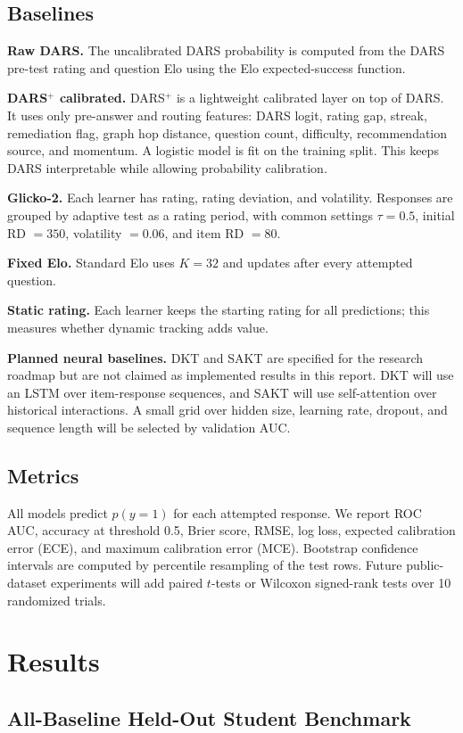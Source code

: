 \documentclass[sigconf,nonacm]{acmart}
\begin{document}
\subsection{Baselines}
\textbf{Raw DARS.} The uncalibrated DARS probability is computed from the DARS pre-test rating and question Elo using the Elo expected-success function.

\textbf{DARS$^+$ calibrated.} DARS$^+$ is a lightweight calibrated layer on top of DARS. It uses only pre-answer and routing features: DARS logit, rating gap, streak, remediation flag, graph hop distance, question count, difficulty, recommendation source, and momentum. A logistic model is fit on the training split. This keeps DARS interpretable while allowing probability calibration.

\textbf{Glicko-2.} Each learner has rating, rating deviation, and volatility. Responses are grouped by adaptive test as a rating period, with common settings $\tau=0.5$, initial RD $=350$, volatility $=0.06$, and item RD $=80$.

\textbf{Fixed Elo.} Standard Elo uses $K=32$ and updates after every attempted question.

\textbf{Static rating.} Each learner keeps the starting rating for all predictions; this measures whether dynamic tracking adds value.

\textbf{Planned neural baselines.} DKT and SAKT are specified for the research roadmap but are not claimed as implemented results in this report. DKT will use an LSTM over item-response sequences, and SAKT will use self-attention over historical interactions. A small grid over hidden size, learning rate, dropout, and sequence length will be selected by validation AUC.

\subsection{Metrics}
All models predict $p(y=1)$ for each attempted response. We report ROC AUC, accuracy at threshold 0.5, Brier score, RMSE, log loss, expected calibration error (ECE), and maximum calibration error (MCE). Bootstrap confidence intervals are computed by percentile resampling of the test rows. Future public-dataset experiments will add paired $t$-tests or Wilcoxon signed-rank tests over 10 randomized trials.

\section{Results}
\subsection{All-Baseline Held-Out Student Benchmark}
\end{document}
